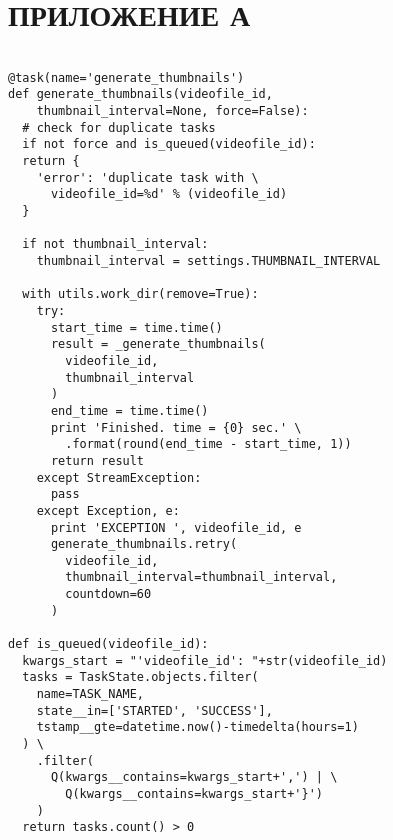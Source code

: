 \section*{ПРИЛОЖЕНИЕ А}


\begin{lstlisting}[caption={Образец реализации задачи по генерации скриншотов из видео}, label=lst:thumbnails]

@task(name='generate_thumbnails')
def generate_thumbnails(videofile_id,
    thumbnail_interval=None, force=False):
  # check for duplicate tasks
  if not force and is_queued(videofile_id):
  return {
    'error': 'duplicate task with \
      videofile_id=%d' % (videofile_id)
  }

  if not thumbnail_interval:
    thumbnail_interval = settings.THUMBNAIL_INTERVAL

  with utils.work_dir(remove=True):
    try:
      start_time = time.time()
      result = _generate_thumbnails(
        videofile_id,
        thumbnail_interval
      )
      end_time = time.time()
      print 'Finished. time = {0} sec.' \
        .format(round(end_time - start_time, 1))
      return result
    except StreamException:
      pass
    except Exception, e:
      print 'EXCEPTION ', videofile_id, e
      generate_thumbnails.retry(
        videofile_id,
        thumbnail_interval=thumbnail_interval,
        countdown=60
      )

def is_queued(videofile_id):
  kwargs_start = "'videofile_id': "+str(videofile_id)
  tasks = TaskState.objects.filter(
    name=TASK_NAME,
    state__in=['STARTED', 'SUCCESS'],
    tstamp__gte=datetime.now()-timedelta(hours=1)
  ) \
    .filter(
      Q(kwargs__contains=kwargs_start+',') | \
        Q(kwargs__contains=kwargs_start+'}')
    )
  return tasks.count() > 0
\end{lstlisting}
